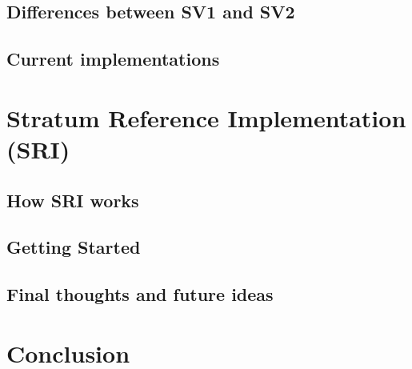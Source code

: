 \documentclass[a4paper,12pt,twoside,english]{toptesi}
\begin{document}
\section{Differences between SV1 and SV2}

\newpage
\section{Current implementations}

\chapter{Stratum Reference Implementation (SRI)}
\section{How SRI works}

\newpage
\section{Getting Started}

\newpage
\section{Final thoughts and future ideas}

\chapter{Conclusion}


%


\end{document}
